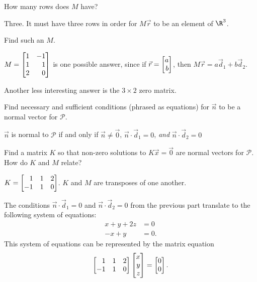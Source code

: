 \documentclass{problemset}
\begin{document}
	\begin{parts}
		\item How many rows does $M$ have?
			\begin{solution}
				Three. It must have three rows in order for $M\vec r$ to be an
				element of $\R^3$.
			\end{solution}
		\item Find such an $M$.
			\begin{solution}
				$M=\mat{1&-1\\1&1\\2&0}$ is one possible answer, since if
				$\vec r = \mat{a\\b}$, then $M \vec r = a \vec d_1 + b \vec d_2$.

				Another less interesting answer is the $3\times2$ zero matrix.
			\end{solution}
		\item Find necessary and sufficient conditions (phrased as equations) for
			$\vec n$ to be a normal vector for $\mathcal P$.
			\begin{solution}
				$\vec n$ is normal to $\mathcal P$ if and only if $\vec n\neq \vec 0$,
				$\vec n\cdot\vec d_1=0$, \emph{and} $\vec n\cdot\vec d_2=0$
			\end{solution}
		\item Find a matrix $K$ so that non-zero solutions to $K\vec x=\vec 0$ are normal
			vectors for $\mathcal P$. How do $K$ and $M$ relate?
			\begin{solution}
				$K = \mat{1&1&2\\-1&1&0}$. $K$ and $M$ are transposes of
				one another.

				The conditions $\vec n\cdot\vec d_1=0$ and $\vec n\cdot\vec d_2=0$
				from the previous part translate to the following system of equations:
				\begin{align*}
					x + y + 2z &= 0 \\
					-x + y &= 0.
				\end{align*}
				This system of equations can be represented by the matrix equation
				\[
					\mat{1&1&2\\-1&1&0}\mat{x\\y\\z} = \mat{0\\0}.
				\]
			\end{solution}
	\end{parts}
\end{document}
